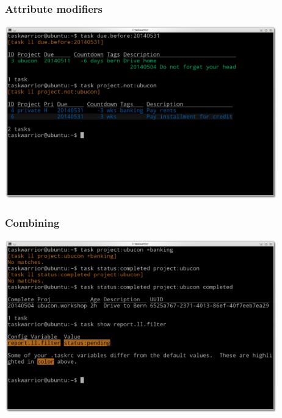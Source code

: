 \documentclass[t,handout]{beamer}
\begin{document}
\begin{frame}[fragile]\frametitle{Attribute modifiers}
\begin{center} %
\includegraphics[width=11.8cm,height=7.5cm]{attribute-modifiers.png}
\end{center}
\end{frame}

\begin{frame}[fragile]\frametitle{Combining}
\begin{center} %
\includegraphics[width=11.8cm,height=7.5cm]{combining.png}
\end{center}
\end{frame}
\end{document}

